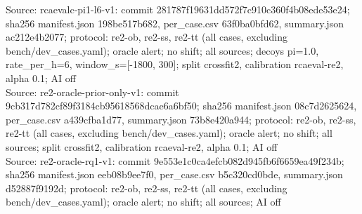 \begin{table}[t]
Source: rcaevalc-pi1-l6-v1: commit 281787f19631dd572f7c910c360f4b08ede53e24; sha256 manifest.json 198be517b682, per\_case.csv 63f0ba0bfd62, summary.json ac212e4b2077; protocol: re2-ob, re2-ss, re2-tt (all cases, excluding bench/dev\_cases.yaml); oracle alert; no shift; all sources; decoys pi=1.0, rate\_per\_h=6, window\_s=[-1800, 300]; split crossfit2, calibration rcaeval-re2, alpha 0.1; AI off\\
Source: re2-oracle-prior-only-v1: commit 9cb317d782cf89f3184cb95618568dcae6a6bf50; sha256 manifest.json 08c7d2625624, per\_case.csv a439cfba1d77, summary.json 73b8e420a944; protocol: re2-ob, re2-ss, re2-tt (all cases, excluding bench/dev\_cases.yaml); oracle alert; no shift; all sources; split crossfit2, calibration rcaeval-re2, alpha 0.1; AI off\\
Source: re2-oracle-rq1-v1: commit 9e553e1c0ca4efcb082d945fb6f6659ea49f234b; sha256 manifest.json eeb08b9ee7f0, per\_case.csv b5c320cd0bde, summary.json d52887f9192d; protocol: re2-ob, re2-ss, re2-tt (all cases, excluding bench/dev\_cases.yaml); oracle alert; no shift; all sources; AI off\\
\end{table}
